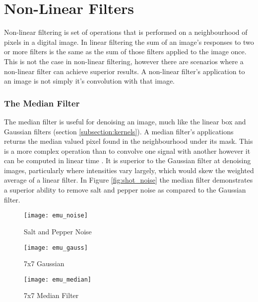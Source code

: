 \section{Non-Linear Filters}

Non-linear filtering is set of operations that is performed on a neighbourhood of pixels in a digital image. In linear filtering the sum of an image's responses to two or more filters is the same as the sum of those filters applied to the image once. This is not the case in non-linear filtering, however there are scenarios where a non-linear filter can achieve superior results. A non-linear filter's application to an image is not simply it's convolution with that image.

\subsubsection{The Median Filter}

The median filter is useful for denoising an image, much like the linear box and Gaussian filters (section \ref{subsection:kernels}). A median filter's applications returns the median valued pixel found in the neighbourhood under its mask. This is a more complex operation than to convolve one signal with another however it can be computed in linear time \cite{cormen_2001}. It is superior to the Gaussian filter at denoising images, particularly where intensities vary largely, which would skew the weighted average of a linear filter. In Figure \ref{fig:shot_noise} the median filter demonstrates a superior ability to remove salt and pepper noise as compared to the Gaussian filter.

\begin{figure*}[htbp]
    \centering 
    \begin{subfigure}[b]{0.3\textwidth}
        \texttt{[image: emu\_noise]}
        \caption{Salt and Pepper Noise}
        \label{fig:emu_noise}
    \end{subfigure}
    \begin{subfigure}[b]{0.3\textwidth}
        \texttt{[image: emu\_gauss]}
        \caption{7x7 Gaussian}
        \label{fig:emu_gauss}
    \end{subfigure}
    \begin{subfigure}[b]{0.3\textwidth}
        \texttt{[image: emu\_median]}
        \caption{7x7 Median Filter}
        \label{fig:emu_median}
    \end{subfigure}
    \captionsetup{format=hang}
    \caption{Filtering out salt and pepper noise with Gaussian and median filter. Original image by Grant Durr.}
    \label{fig:shot_noise}
\end{figure*}
